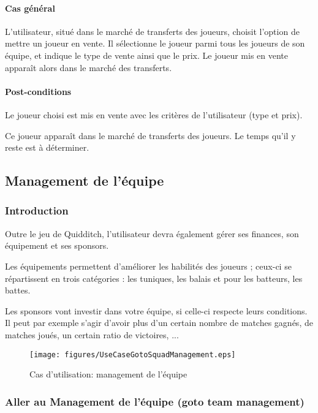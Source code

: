 \paragraph{Cas général}
L'utilisateur, situé dans le marché de transferts des joueurs, choisit l'option de mettre un joueur en vente. Il sélectionne le joueur parmi tous les joueurs de son équipe, et indique le type de vente ainsi que le prix. Le joueur mis en vente apparaît alors dans le marché des transferts.
\paragraph{Post-conditions}
\begin{list}{}{\leftmargin=1.5em}
\item{Le joueur choisi est mis en vente avec les critères de l'utilisateur (type et prix).}
\item{Ce joueur apparaît dans le marché de transferts des joueurs. Le temps qu'il y reste est à déterminer.}
\end{list}

\subsection{Management de l'équipe}

\subsubsection{Introduction}
Outre le jeu de Quidditch, l'utilisateur devra également gérer ses finances, son équipement et ses sponsors.

Les équipements permettent d'améliorer les habilités des joueurs ; ceux-ci se répartissent en trois catégories : les tuniques, les balais et pour les batteurs, les battes.

Les sponsors vont investir dans votre équipe, si celle-ci respecte leurs conditions. Il peut par exemple s'agir d'avoir plus d'un certain nombre de matches gagnés, de matches joués, un certain ratio de victoires, ...

\begin{figure}[h]
  \centering
  \texttt{[image: figures/UseCaseGotoSquadManagement.eps]}
   \caption{\label{fig:UC:gotoManagement} Cas d'utilisation: management de l'équipe}
\end{figure}

\subsubsection{Aller au Management de l'équipe (goto team management)}
\label{UC:gotoManagement}
